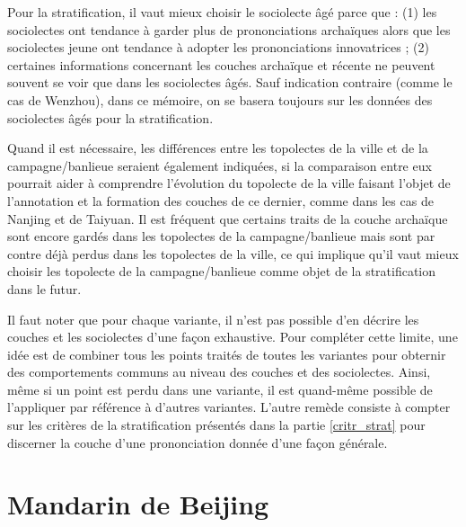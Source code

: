 \documentclass{scrbook}
\newcounter{c}[subsubsection]
\newcommand{\difwenbai}{couches archaïque et récente\xspace}
\newcommand{\diflaoxin}{sociolectes âgé et jeune\xspace}
\begin{document}
\begin{sloppypar}
Pour la stratification, il vaut mieux choisir le sociolecte âgé parce que %
: (1) les sociolectes ont tendance à garder plus de prononciations archaïques alors que les sociolectes jeune ont tendance à adopter les prononciations innovatrices ; (2) certaines informations concernant les \difwenbai ne peuvent souvent se voir que dans les sociolectes âgés. Sauf indication contraire (comme le cas de Wenzhou), dans ce mémoire, on se basera toujours sur les données des sociolectes âgés pour la stratification. 

Quand il est nécessaire, les différences entre les topolectes de la ville et de la campagne/banlieue seraient également indiquées, si la comparaison entre eux pourrait aider à comprendre l'évolution du topolecte de la ville faisant l'objet de l'annotation et la formation des couches de ce dernier, comme dans les cas de Nanjing et de Taiyuan. Il est fréquent que certains traits de la couche archaïque sont encore gardés dans les topolectes de la campagne/banlieue mais sont par contre déjà perdus dans les topolectes de la ville, ce qui implique qu'il vaut mieux choisir les topolecte de la campagne/banlieue comme objet de la stratification dans le futur.

Il faut noter que pour chaque variante, il n'est pas possible d'en décrire les couches et les sociolectes d'une façon exhaustive. Pour compléter cette limite, une idée est de combiner tous les points traités de toutes les variantes pour obternir des comportements communs au niveau des couches et des sociolectes. Ainsi, même si un point est perdu dans une variante, il est quand-même possible de l'appliquer par référence à d'autres variantes. L'autre remède consiste à compter sur les critères de la stratification présentés dans la partie \ref{critr_strat} pour discerner la couche d'une prononciation donnée d'une façon générale. 

\section{Mandarin de Beijing}

\end{sloppypar}
\end{document}
